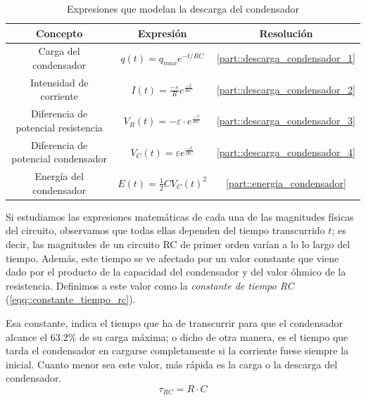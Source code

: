 \documentclass[../main.tex]{subfiles}
\begin{document}
\begin{table}[!ht]
    \begin{center}
        \begin{tabular}{|| c | c | c ||}
            \hline
            \textbf{Concepto} & \textbf{Expresión} &  \textbf{Resolución}\\ \hline
            Carga del condensador & $q(t) = q_{max} e^{-t/{RC}}$ & \ref{part::descarga_condensador_1} \\
            Intensidad de corriente & $I(t) = \frac{-\varepsilon}{R}e^{\frac{-t}{RC}}$ & \ref{part::descarga_condensador_2} \\
            Diferencia de potencial resistencia & $V_R(t) = -\varepsilon \cdot e^{\frac{-t}{RC}}$ & \ref{part::descarga_condensador_3} \\ 
            Diferencia de potencial condensador & $V_C(t) = \varepsilon   e^{\frac{-t}{RC}}$ & \ref{part::descarga_condensador_4} \\ 
            Energía del condensador & $E(t) = \frac{1}{2}CV_C(t)^2 $ & \ref{part::energia_condensador} \\
            \hline
            \end{tabular}
            \caption{Expresiones que modelan la descarga del condensador}
            \label{tab::ecuaciones_descarga_rc}
    \end{center}
\end{table}


\newpage
Si estudiamos las expresiones matemáticas de cada una de las magnitudes físicas del circuito, observamos que todas ellas dependen del tiempo transcurrido $t$; es decir, las magnitudes de un circuito RC de primer orden varían a lo lo largo del tiempo. Además, este tiempo se ve afectado por un valor constante que viene dado por el producto de la capacidad del condensador y del valor óhmico de la resistencia. Definimos a este valor como la \textit{constante de tiempo RC} (\ref{eqq::constante_tiempo_rc}). 

Esa constante, indica el tiempo que ha de transcurrir para que el condensador alcance el $63.2\%$ de su carga máxima; o dicho de otra manera, es el tiempo que tarda el condensador en cargarse completamente si la corriente fuese siempre la inicial. Cuanto menor sea este valor, más rápida es la carga o la descarga del condensador.
\begin{equation}
    \tau_{RC} = R \cdot C
    \label{eqq::constante_tiempo_rc}
\end{equation}
\end{document}
